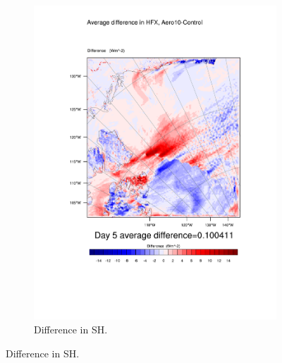 \begin{figure}
\begin{subfigure}{0.48\textwidth}
		\includegraphics[width=\textwidth]{results/aero10/diff_Aero10_HFX_Day5.pdf}
		\caption{Difference in SH.}
		\label{subfig:sh_r3Day5}
	\end{subfigure}


\end{figure}
